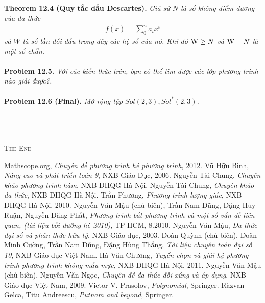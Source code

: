 \documentclass[a4paper,oneside]{book}
\numberwithin{equation}{chapter}
\begin{document}
\textbf{Theorem 12.4 (Quy tắc dấu Descartes).} \textit{Giả sử $N$ là số không điểm dương của đa thức 
\begin{align}
f\left( x \right) = \sum\limits_0^n {{a_i}{x^i}} 
\end{align}
và $W$ là số lần đổi dấu trong dãy các hệ số của nó. Khi đó ${\rm{W}} \ge N$ và ${\rm{W}} - N$ là một số chẵn.}\\
\\
\textbf{Problem 12.5.} \textit{Với các kiến thức trên, bạn có thể tìm được các lớp phương trình nào giải được?.}\\
\\
\textbf{Problem 12.6 (Final).} \textit{Mở rộng tập $Sol\left( {2,3} \right),So{l^*}\left( {2,3} \right)$.}\\
\\
\\
\\
\begin{center}
\textsc{The End}
\end{center}
\newpage
\printindex
\newpage
\begin{thebibliography}{9}
 Mathscope.org, \textit{Chuyên đề phương trình hệ phương trình}, 2012.
 Vũ Hữu Bình, \textit{Nâng cao và phát triển toán 9}, NXB Giáo Dục, 2006.
 Nguyễn Tài Chung, \textit{Chuyên khảo phương trình hàm}, NXB ĐHQG Hà Nội.
 Nguyễn Tài Chung, \textit{Chuyên khảo đa thức}, NXB ĐHQG Hà Nội.
 Trần Phương, \textit{Phương trình lượng giác}, NXB ĐHQG Hà Nội, 2010.
 Nguyễn Văn Mậu (chủ biên), Trần Nam Dũng, Đặng Huy Ruận, Nguyễn Đăng Phất, \textit{Phương trình bất phương trình và một số vấn đề liên quan, (tài liệu bồi dưỡng hè 2010)}, TP HCM, 8.2010.
 Nguyễn Văn Mậu, \textit{Đa thức đại số và phân thức hữu tỷ}, NXB Giáo dục, 2003.
 Đoàn Quỳnh (chủ biên), Doãn Minh Cường, Trần Nam Dũng, Đặng Hùng Thắng, \textit{Tài liệu chuyên toán đại số 10}, NXB Giáo dục Việt Nam.
 Hà Văn Chương, \textit{Tuyển chọn và giải hệ phương trình phương trình không mẫu mực}, NXB ĐHQG Hà Nội, 2011.
 Nguyễn Văn Mậu (chủ biên), Nguyễn Văn Ngọc, \textit{Chuyên đề đa thức đối xứng và áp dụng}, NXB Giáo dục Việt Nam, 2009.
 Victor V. Prasolov, \textit{Polynomial}, Springer.
 Răzvan Gelca, Titu Andreescu, \textit{Putnam and beyond}, Springer. 
\end{thebibliography}
\end{document}
